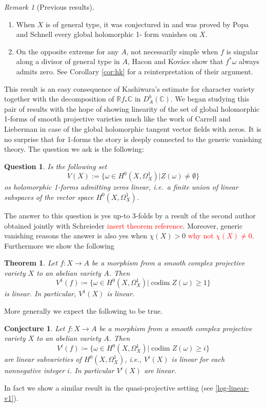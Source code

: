 \documentclass[12pt,reqno]{amsart}
\newtheorem{conjecture}[theorem]{Conjecture}
\newtheorem{alphtheorem}{Theorem}
\theoremstyle{question}
\newtheorem{question}[theorem]{Question}
\theoremstyle{definition}
\theoremstyle{remark}
\newtheorem{remark}[theorem]{Remark}
\theoremstyle{cited}
\theoremstyle{citeddef}
\DeclareMathOperator{\codim}{codim}              %
\newcommand{\bbC}{\mathbb{C}}
\newcommand{\bbR}{\mathbb{R}}
\newcommand{\sorry}[1]{\textcolor{red}{#1}}
\begin{document}
\begin{remark}[Previous results]
\begin{enumerate}
\item \label{item:ps} When $X$ is of general type, it was conjectured in
	\cite{HK05, LZ05} and was proved
	by Popa and Schnell \cite{PS14} every global holomorphic 1-		
	form vanishes on $X$. 
\item \label{item:hk} On the opposite extreme for any $A$, not necessarily simple when $f$ is singular along a divisor of general
		type in $A$, Hacon and Kov\'acs \cite[Proposition 3.5.]{HK05} show that
		$f^*\omega$ always admits zero. See Corollary \ref{cor:hk}
		for a reinterpretation of their argument. 
\end{enumerate}	
\end{remark}

This result is an easy consequence of Kashiwara's estimate for character variety together with the decomposition of $\bbR f_*\bbC$ in $D^b_{A}(\bbC)$. We began studying this pair of results with the
hope of showing linearity of the set of global holomorphic 1-forms
of smooth projective varieties much like the work of   Carrell and Lieberman \cite{CL73}
in case of the global holomorphic tangent vector fields with zeros. It is no surprise that for 1-forms the story is deeply connected to the generic
vanishing theory. The question we ask is the following:
\begin{question}
Is the following set
\[V(X):=\{ \omega\in H^0(X, \Omega_X^1) | Z(\omega)\neq \emptyset\}\]
os holomorphic 1-forms admitting zeros linear, i.e.\ a finite
union of linear subspaces of the vector space $H^0(X, \Omega_X^1)$.
\end{question} 

The answer to this question is yes up-to 3-folds by
a result of the second author obtained jointly with Schreieder
\sorry{insert theorem reference}. Moreover,
generic vanishing reasons the answer is also yes 
when $\chi(X)>0$ \sorry{why not $\chi(X)\neq 0$}. Furthermore
we show the following

\begin{alphtheorem}
Let $f: X\to A$ be a morphism from a smooth complex projective variety $X$ to an abelian variety $A$. Then 
\[V^1(f) \coloneqq \{\omega\in H^0(X,\Omega_X^1)| \codim Z(\omega) \geq 1\}\]
 is linear. In particular, $V^1(X)$ is linear.
\end{alphtheorem}

More generally we expect the following to be true.
\begin{conjecture} \label{linear-v1}
Let $f: X\to A$ be a morphism from a smooth complex projective variety $X$ to an abelian variety $A$. Then 
\[V^i(f)\coloneqq \{\omega\in H^0(X,\Omega_X^1)| \codim Z(\omega) \geq i\}\] are linear subvarieties of $H^0(X, \Omega_X^1)$, i.e., $V^i(X)$ is linear for each nonnegative integer $i$. In particular $V^i(X)$ are linear.
\end{conjecture}
In fact we show a similar result in the quasi-projective setting
(see \ref{log-linear-v1}). 
\end{document}
